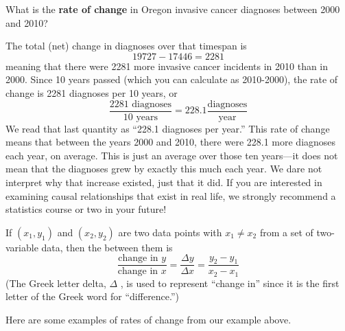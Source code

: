 \documentclass[nooutcomes]{ximera}
\begin{document}
\begin{example}
What is the \textbf{rate of change} in Oregon invasive cancer diagnoses between 2000 and 2010? 

\begin{explanation}
The total (net) change in diagnoses over that timespan is
$$19727-17446=2281$$
meaning that there were 2281 more invasive cancer incidents in 2010 than in 2000. Since 10 years passed (which you can calculate as 2010-2000), the rate of change is 2281 diagnoses per 10 years, or
$$\frac{2281 \text{ diagnoses}}{10 \text{ years}} = 228.1 \frac{\text{diagnoses}}{\text{year}}$$
We read that last quantity as ``228.1 diagnoses per year.'' This rate of change means that between the years 2000 and 2010, there were 228.1 more diagnoses each year, on average. This is just an average over those ten years—it does not mean that the diagnoses grew by exactly this much each year.  We dare not interpret why that increase existed,  just that it did.  If you are interested in examining causal relationships that exist in real life,  we strongly recommend a statistics course or two in your future!
\end{explanation}
\end{example}


\begin{definition} 
 If $(x_1,y_1)$ and $(x_2,y_2)$ are two data points with $x_1 \neq x_2$ from a set of two-variable data, then the  between them is
$$ \frac{\text{change in } y}{\text{change in } x} = \frac{\Delta y}{\Delta x} = \frac{y_2-y_1}{x_2-x_1}$$
(The Greek letter delta, $\Delta$ , is used to represent ``change in'' since it is the first letter of the Greek word for ``difference.'')
\end{definition}


Here are some examples of rates of change from our example above.
\end{document}
